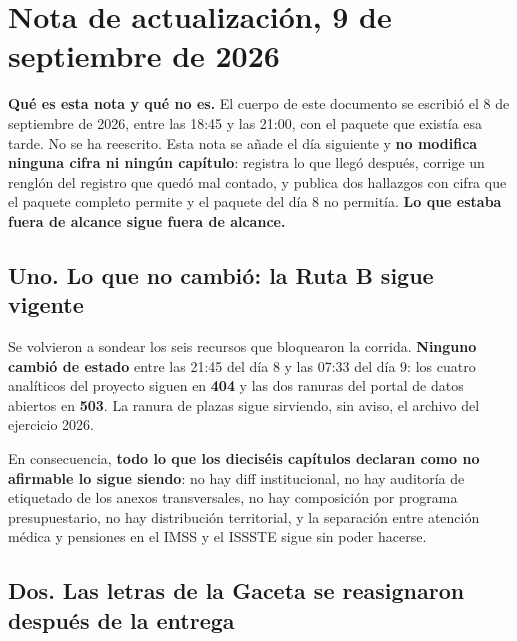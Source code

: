 \chapter*{Nota de actualización, 9 de septiembre de 2026}


\textbf{Qué es esta nota y qué no es.} El cuerpo de este documento se escribió el 8 de
septiembre de 2026, entre las 18:45 y las 21:00, con el paquete que existía esa tarde. No se
ha reescrito. Esta nota se añade el día siguiente y \textbf{no modifica ninguna cifra ni
ningún capítulo}: registra lo que llegó después, corrige un renglón del registro que quedó
mal contado, y publica dos hallazgos con cifra que el paquete completo permite y el paquete
del día 8 no permitía. \textbf{Lo que estaba fuera de alcance sigue fuera de alcance.}

\section*{Uno. Lo que no cambió: la Ruta B sigue vigente}

Se volvieron a sondear los seis recursos que bloquearon la corrida. \textbf{Ninguno cambió
de estado} entre las 21:45 del día 8 y las 07:33 del día 9: los cuatro analíticos del
proyecto siguen en \textbf{404} y las dos ranuras del portal de datos abiertos en
\textbf{503}. La ranura de plazas sigue sirviendo, sin aviso, el archivo del ejercicio 2026.

En consecuencia, \textbf{todo lo que los dieciséis capítulos declaran como no afirmable lo
sigue siendo}: no hay diff institucional, no hay auditoría de etiquetado de los anexos
transversales, no hay composición por programa presupuestario, no hay distribución
territorial, y la separación entre atención médica y pensiones en el IMSS y el ISSSTE sigue
sin poder hacerse.

\section*{Dos. Las letras de la Gaceta se reasignaron después de la entrega}

